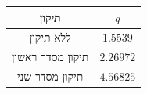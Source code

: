 \begin{tabular}{c c}
תיקון & $q$ \\
\hline
ללא תיקון & $1.5539$ \\
תיקון מסדר ראשון & $2.26972$ \\
תיקון מסדר שני & $4.56825$ \\
\end{tabular}
